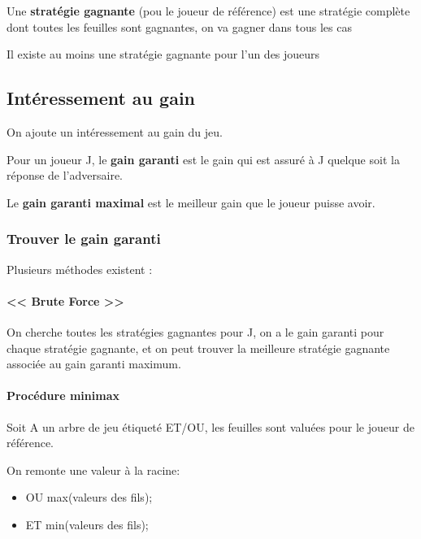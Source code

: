 \documentclass[12pt,a4paper,openany]{book}
\begin{document}
	\begin{definition}
		Une \textbf{stratégie gagnante} (pou le joueur de référence)
		est une stratégie complète dont toutes les feuilles sont
		gagnantes, on va gagner dans tous les cas 
	\end{definition}

	\begin{attention}
		Il existe au moins une stratégie gagnante pour l'un des joueurs
	\end{attention}

	\subsection{Intéressement au gain}
	On ajoute un intéressement au gain du jeu.

	\begin{definition}
		Pour un joueur J, le \textbf{gain garanti} est le gain qui est assuré à J quelque soit la réponse de l'adversaire.
	\end{definition}

	\begin{definition}
		Le \textbf{gain garanti maximal} est le meilleur gain que le joueur puisse avoir.
	\end{definition}


	\subsubsection{Trouver le gain garanti}
	Plusieurs méthodes existent : 
	\paragraph{<< Brute Force >>} On cherche toutes les stratégies gagnantes pour J, on a le gain garanti pour chaque stratégie gagnante, et on peut trouver la meilleure stratégie gagnante associée au gain garanti maximum.

	\paragraph{Procédure minimax} Soit A un arbre de jeu étiqueté ET/OU, les feuilles sont valuées pour le joueur de référence.

On remonte une valeur à la racine:
\begin{itemize}
	\item OU max(valeurs des fils);
	\item ET min(valeurs des fils);
\end{itemize}
~
\end{document}
